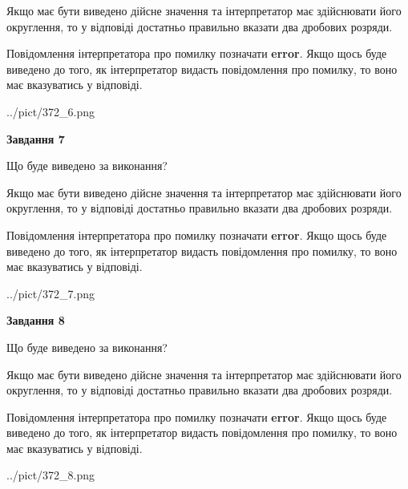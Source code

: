\documentclass[12pt, ukrainian]{article}
\begin{document}
{\begin {Large}
Якщо має бути виведено дійсне значення та інтерпретатор має здійснювати його округлення, 
то у відповіді достатньо правильно вказати два дробових розряди.

Повідомлення інтерпретатора про помилку позначати \textbf{error}.
Якщо щось буде виведено до того, як інтерпретатор видасть повідомлення про помилку, 
то воно має вказуватись у відповіді. \par

\begin{center}
	{../pict/372_6.png}
\end{center}
\newpage

{\begin {center}\textbf{Завдання 7}\end {center}}\par
Що буде виведено за виконання? \par

Якщо має бути виведено дійсне значення та інтерпретатор має здійснювати його округлення, 
то у відповіді достатньо правильно вказати два дробових розряди.

Повідомлення інтерпретатора про помилку позначати \textbf{error}.
Якщо щось буде виведено до того, як інтерпретатор видасть повідомлення про помилку, 
то воно має вказуватись у відповіді. \par

\begin{center}
	{../pict/372_7.png}
\end{center}
\newpage

{\begin {center}\textbf{Завдання 8}\end {center}}\par
Що буде виведено за виконання? \par

Якщо має бути виведено дійсне значення та інтерпретатор має здійснювати його округлення, 
то у відповіді достатньо правильно вказати два дробових розряди.

Повідомлення інтерпретатора про помилку позначати \textbf{error}.
Якщо щось буде виведено до того, як інтерпретатор видасть повідомлення про помилку, 
то воно має вказуватись у відповіді. \par

\begin{center}
	{../pict/372_8.png}
\end{center}
\newpage


\end{Large}}
\end{document}
